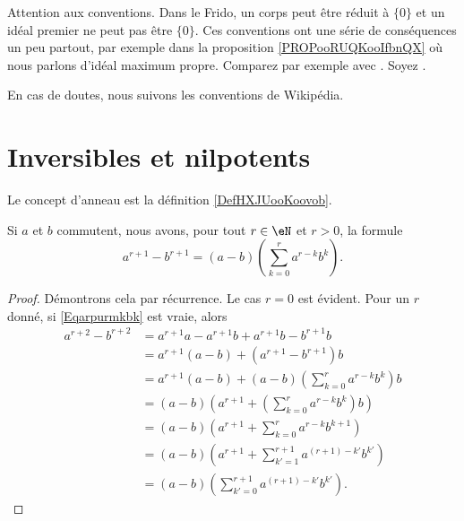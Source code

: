 
Attention aux conventions. Dans le Frido, un corps peut être réduit à \( \{ 0 \}\) et un idéal premier ne peut pas être \( \{ 0 \}\). Ces conventions ont une série de conséquences un peu partout, par exemple dans la proposition \ref{PROPooRUQKooIfbnQX} où nous parlons d'idéal maximum propre. Comparez par exemple avec \cite{ooWEUDooQybvIx}. Soyez .

En cas de doutes, nous suivons les conventions de Wikipédia.

\section{Inversibles et nilpotents}

Le concept d'anneau est la définition \ref{DefHXJUooKoovob}.

\begin{lemma}       \label{LEMooOYZEooLivKWI}
	Si \( a\) et \( b\) commutent, nous avons, pour tout \( r \in \eN \) et \( r > 0\), la formule
	\begin{equation}        \label{Eqarpurmkbk}
		a^{r+1}-b^{r+1}=(a-b)\left(\sum_{k=0}^ra^{r-k}b^k\right).
	\end{equation}
\end{lemma}

\begin{proof}
	Démontrons cela par récurrence. Le cas \( r = 0 \) est évident. Pour
	un \( r \) donné, si \eqref{Eqarpurmkbk} est vraie, alors
	\begin{align*}
		a^{r+2}-b^{r+2} & = a^{r+1}a - a^{r+1}b +a^{r+1}b - b^{r+1}b                            \\
		                & = a^{r+1}(a - b) + (a^{r+1} - b^{r+1})b                               \\
		                & = a^{r+1}(a - b) + (a-b)\left(\sum_{k=0}^ra^{r-k}b^k\right)b          \\
		                & = (a - b) \left(a^{r+1} + \left(\sum_{k=0}^ra^{r-k}b^k\right)b\right) \\
		                & = (a - b) \left(a^{r+1} + \sum_{k=0}^ra^{r-k}b^{k + 1}\right)         \\
		                & = (a - b) \left(a^{r+1} + \sum_{k'=1}^{r+1}a^{(r+1)-k'}b^{k'}\right)  \\
		                & = (a - b) \left(\sum_{k'=0}^{r+1}a^{(r+1)-k'}b^{k'}\right).
	\end{align*}
\end{proof}


